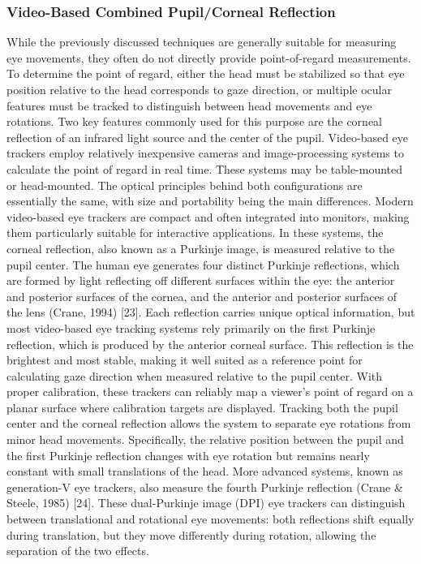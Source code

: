 \documentclass{article}
\begin{document}
\subsubsection{Video-Based Combined Pupil/Corneal Reflection}

While the previously discussed techniques are generally suitable for measuring eye movements, they often do not directly provide point-of-regard measurements.
To determine the point of regard, either the head must be stabilized so that eye position relative to the head corresponds to gaze direction, or multiple ocular features must be tracked to distinguish between head movements and eye rotations.
Two key features commonly used for this purpose are the corneal reflection of an infrared light source and the center of the pupil.
Video-based eye trackers employ relatively inexpensive cameras and image-processing systems to calculate the point of regard in real time. 
These systems may be table-mounted or head-mounted.
The optical principles behind both configurations are essentially the same, with size and portability being the main differences.
Modern video-based eye trackers are compact and often integrated into monitors, making them particularly suitable for interactive applications.
In these systems, the corneal reflection, also known as a Purkinje image, is measured relative to the pupil center.
The human eye generates four distinct Purkinje reflections, which are formed by light reflecting off different surfaces within the eye: the anterior and posterior surfaces of the cornea, and the anterior and posterior surfaces of the lens (Crane, 1994) [23].
Each reflection carries unique optical information, but most video-based eye tracking systems rely primarily on the first Purkinje reflection, which is produced by the anterior corneal surface. 
This reflection is the brightest and most stable, making it well suited as a reference point for calculating gaze direction when measured relative to the pupil center.
With proper calibration, these trackers can reliably map a viewer's point of regard on a planar surface where calibration targets are displayed. 
Tracking both the pupil center and the corneal reflection allows the system to separate eye rotations from minor head movements.
Specifically, the relative position between the pupil and the first Purkinje reflection changes with eye rotation but remains nearly constant with small translations of the head.
More advanced systems, known as generation-V eye trackers, also measure the fourth Purkinje reflection (Crane \& Steele, 1985) [24].
These dual-Purkinje image (DPI) eye trackers can distinguish between translational and rotational eye movements: both reflections shift equally during translation, but they move differently during rotation, allowing the separation of the two effects.
\end{document}
